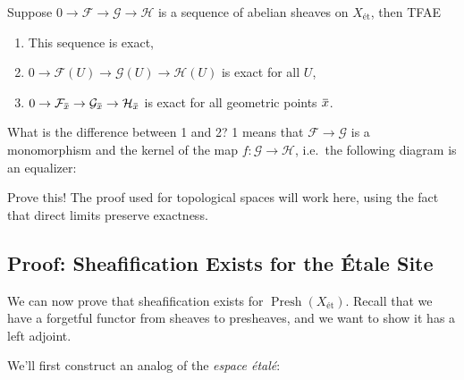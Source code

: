 \begin{lemma}[?]

Suppose \(0 \to \mathcal{F}\to \mathcal{G}\to \mathcal{H}\) is a
sequence of abelian sheaves on \(X_{\text{ét}}\), then TFAE

\begin{enumerate}
\def\labelenumi{\arabic{enumi}.}
\item
  This sequence is exact,
\item
  \(0 \to \mathcal{F}(U) \to \mathcal{G}(U) \to \mathcal{H}(U)\) is
  exact for all \(U\),
\item
  \(0 \to \mathcal{F}_{\mkern 1.5mu\overline{\mkern-1.5mux\mkern-1.5mu}\mkern 1.5mu} \to \mathcal{G}_{\mkern 1.5mu\overline{\mkern-1.5mux\mkern-1.5mu}\mkern 1.5mu} \to \mathcal{H}_{\mkern 1.5mu\overline{\mkern-1.5mux\mkern-1.5mu}\mkern 1.5mu}\)
  is exact for all geometric points
  \(\mkern 1.5mu\overline{\mkern-1.5mux\mkern-1.5mu}\mkern 1.5mu\).
\end{enumerate}

\end{lemma}

\begin{remark}

What is the difference between 1 and 2? 1 means that
\(\mathcal{F}\to \mathcal{G}\) is a monomorphism and the kernel of the
map \(f: \mathcal{G}\to \mathcal{H}\), i.e.~the following diagram is an
equalizer:

\end{remark}

\begin{exercise}[?]

Prove this! The proof used for topological spaces will work here, using
the fact that direct limits preserve exactness.

\end{exercise}

\hypertarget{proof-sheafification-exists-for-the-uxe9tale-site}{%
\subsection{Proof: Sheafification Exists for the Étale
Site}\label{proof-sheafification-exists-for-the-uxe9tale-site}}

We can now prove that sheafification exists for
\({\operatorname{Presh}}(X_{\text{ét}})\). Recall that we have a
forgetful functor from sheaves to presheaves, and we want to show it has
a left adjoint.

We'll first construct an analog of the \emph{espace étalé}:

